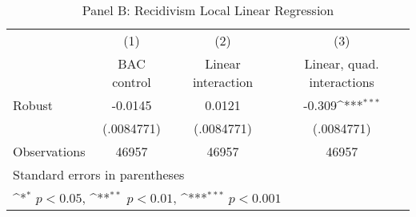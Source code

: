 \begin{table}[htbp]\centering
\def\sym#1{\ifmmode^{#1}\else\(^{#1}\)\fi}
\caption{Panel B: Recidivism Local Linear Regression}
\begin{tabular}{l*{3}{c}}
\hline\hline
                    &\multicolumn{1}{c}{(1)}&\multicolumn{1}{c}{(2)}&\multicolumn{1}{c}{(3)}\\
                    &\multicolumn{1}{c}{BAC control}&\multicolumn{1}{c}{Linear interaction}&\multicolumn{1}{c}{Linear, quad. interactions}\\
\hline
Robust              &     -0.0145         &      0.0121         &      -0.309\sym{***}\\
                    &  (.0084771)         &  (.0084771)         &  (.0084771)         \\
\hline
Observations        &       46957         &       46957         &       46957         \\
\hline\hline
\multicolumn{4}{l}{\footnotesize Standard errors in parentheses}\\
\multicolumn{4}{l}{\footnotesize \sym{*} \(p<0.05\), \sym{**} \(p<0.01\), \sym{***} \(p<0.001\)}\\
\end{tabular}
\end{table}

